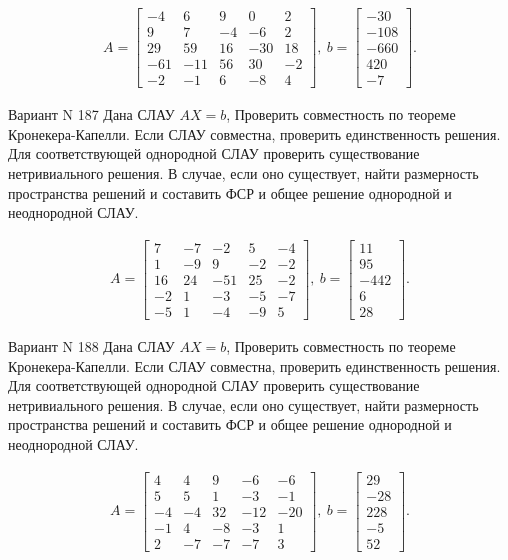 \documentclass[11pt]{report}
\begin{document}
\begin{align*}
 A = \left[\begin{matrix}-4 & 6 & 9 & 0 & 2\\9 & 7 & -4 & -6 & 2\\29 & 59 & 16 & -30 & 18\\-61 & -11 & 56 & 30 & -2\\-2 & -1 & 6 & -8 & 4\end{matrix}\right],
\ b = \left[\begin{matrix}-30\\-108\\-660\\420\\-7\end{matrix}\right]. 
 \end{align*}

Вариант N 187
Дана СЛАУ $AX = b$,
Проверить совместность по теореме Кронекера-Капелли. Если СЛАУ совместна, проверить единственность решения.
Для соответствующей однородной СЛАУ проверить существование нетривиального решения. В случае, если оно существует,
найти размерность пространства решений и составить ФСР и общее решение однородной  и неоднородной СЛАУ.


\begin{align*}
 A = \left[\begin{matrix}7 & -7 & -2 & 5 & -4\\1 & -9 & 9 & -2 & -2\\16 & 24 & -51 & 25 & -2\\-2 & 1 & -3 & -5 & -7\\-5 & 1 & -4 & -9 & 5\end{matrix}\right],
\ b = \left[\begin{matrix}11\\95\\-442\\6\\28\end{matrix}\right]. 
 \end{align*}

Вариант N 188
Дана СЛАУ $AX = b$,
Проверить совместность по теореме Кронекера-Капелли. Если СЛАУ совместна, проверить единственность решения.
Для соответствующей однородной СЛАУ проверить существование нетривиального решения. В случае, если оно существует,
найти размерность пространства решений и составить ФСР и общее решение однородной  и неоднородной СЛАУ.


\begin{align*}
 A = \left[\begin{matrix}4 & 4 & 9 & -6 & -6\\5 & 5 & 1 & -3 & -1\\-4 & -4 & 32 & -12 & -20\\-1 & 4 & -8 & -3 & 1\\2 & -7 & -7 & -7 & 3\end{matrix}\right],
\ b = \left[\begin{matrix}29\\-28\\228\\-5\\52\end{matrix}\right]. 
 \end{align*}
\end{document}
